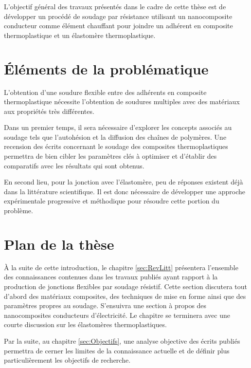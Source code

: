 L'objectif général des travaux présentés dans le cadre de cette thèse est de développer un procédé de soudage par résistance utilisant un nanocomposite conducteur comme élément chauffant pour joindre un adhérent en composite thermoplastique et un élastomère thermoplastique. 



\section{Éléments de la problématique}

L'obtention d'une soudure flexible entre des adhérents en composite thermoplastique nécessite l'obtention de soudures multiples avec des matériaux aux propriétés très différentes. 

Dans un premier temps, il sera nécessaire d'explorer les concepts associés au soudage tels que l'autohésion et la diffusion des chaînes de polymères. 
Une recension des écrits concernant le soudage des composites thermoplastiques permettra de bien cibler les paramètres clés à optimiser et d'établir des comparatifs avec les résultats qui sont obtenus. 

En second lieu, pour la jonction avec l'élastomère, peu de réponses existent déjà dans la littérature scientifique.
Il est donc nécessaire de développer une approche expérimentale progressive et méthodique pour résoudre cette portion du problème. 

\section{Plan de la thèse}  %

À la suite de cette introduction, le chapitre \ref{sec:RevLitt} présentera l'ensemble des connaissances contenues dans les travaux publiés ayant rapport à la production de jonctions flexibles par soudage résistif. 
Cette section discutera tout d'abord des matériaux composites, des techniques de mise en forme ainsi que des paramètres propres au soudage. S'ensuivra une section à propos des nanocomposites conducteurs d'électricité. Le chapitre se terminera avec une courte discussion sur les élastomères thermoplastiques.

Par la suite, au chapitre \ref{sec:Objectifs}, une analyse objective des écrits publiés permettra de cerner les limites de la connaissance actuelle et de définir plus particulièrement les objectifs de recherche. 

